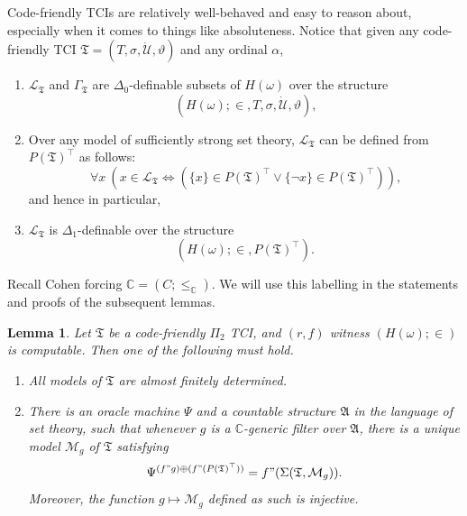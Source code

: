 \documentclass[12pt, twoside]{memoir}
\numberwithin{equation}{section}
\newtheorem{lem}[thm]{Lemma}
\theoremstyle{definition}
\theoremstyle{remark}
\theoremstyle{definition}
\theoremstyle{definition}
\theoremstyle{definition}
\theoremstyle{remark}
\begin{document}
Code-friendly TCIs are relatively well-behaved and easy to reason about, especially when it comes to things like absoluteness. Notice that given any code-friendly TCI $\mathfrak{T} = (T, \sigma, \dot{\mathcal{U}}, \vartheta)$ and any ordinal $\alpha$,
\begin{enumerate}[leftmargin=40pt, label=(CF\arabic*)]
    \item\label{cf1} $\mathcal{L}_{\mathfrak{T}}$ and $\Gamma_{\mathfrak{T}}$ are $\Delta_0$-definable subsets of $H(\omega)$ over the structure 
    \begin{equation*}
        (H(\omega); \in, T, \sigma, \dot{\mathcal{U}}, \vartheta) \text{,}
    \end{equation*}
    \item\label{cf2} Over any model of sufficiently strong set theory, $\mathcal{L}_{\mathfrak{T}}$ can be defined from $P(\mathfrak{T})^{\top}$ as follows:
    \begin{equation*}
        \forall x \ (x \in \mathcal{L}_{\mathfrak{T}} \iff (\{x\} \in P(\mathfrak{T})^{\top} \vee \{\neg x\} \in P(\mathfrak{T})^{\top})) \text{,}
    \end{equation*}
    and hence in particular,
    \item\label{cf3} $\mathcal{L}_{\mathfrak{T}}$ is $\Delta_1$-definable over the structure 
    \begin{equation*}
        (H(\omega); \in, P(\mathfrak{T})^{\top}) \text{.}
    \end{equation*}
\end{enumerate}

Recall Cohen forcing $\mathbb{C} = (C; \leq_{\mathbb{C}})$. We will use this labelling in the statements and proofs of the subsequent lemmas.

\begin{lem}\label{ctblegeneric}
Let $\mathfrak{T}$ be a code-friendly $\Pi_2$ TCI, and $(r, f)$ witness $(H(\omega); \in)$ is computable. Then one of the following must hold.
\begin{enumerate}[label=(\arabic*)]
    \item All models of $\mathfrak{T}$ are almost finitely determined.
    \item\label{3782} There is an oracle machine $\Psi$ and a countable structure $\mathfrak{A}$ in the language of set theory, such that whenever $g$ is a $\mathbb{C}$-generic filter over $\mathfrak{A}$, there is a unique model $\mathcal{M}_g$ of $\mathfrak{T}$ satisfying 
    \begin{equation*}
        \Psi^{(f" g) \oplus (f" (P(\mathfrak{T})^{\top}))} = f" (\Sigma(\mathfrak{T}, \mathcal{M}_g)) \text{.}
    \end{equation*}
    Moreover, the function $g \mapsto \mathcal{M}_g$ defined as such is injective.
\end{enumerate}
\end{lem}
\end{document}
